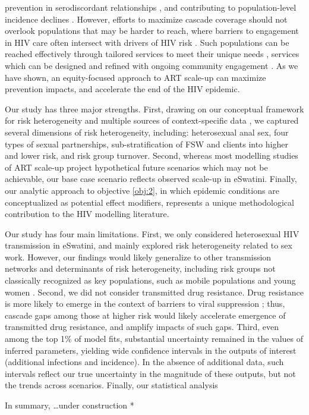 prevention in serodiscordant relationships \cite{Cohen2016},
and contributing to population-level incidence declines \cite{Havlir2020}.
However, efforts to maximize cascade coverage should not overlook
populations that may be harder to reach,
where barriers to engagement in HIV care often intersect with drivers of HIV risk
\cite{Wanyenze2016,Schwartz2017,Schmidt-Sane2022,Baral2019}.
Such populations can be reached effectively through
tailored services to meet their unique needs \cite{Ehrenkranz2019},
services which can be designed and refined with ongoing community engagement
\cite{Chikwari2018,Mlambo2019,Comins2022}.
As we have shown, an equity-focused approach to ART scale-up can maximize prevention impacts,
and accelerate the end of the HIV epidemic.
\par
Our study has three major strengths.
First, drawing on our conceptual framework for risk heterogeneity \cite[Table~1]{Knight2022-sr}
and multiple sources of context-specific data \cite{SDHS2006,SHIMS1,Justman2016,Baral2014,EswKP2014},
we captured several dimensions of risk heterogeneity, including:
heterosexual anal sex,
four types of sexual partnerships,
sub-stratification of FSW and clients into higher and lower risk,
and risk group turnover.
Second, whereas most modelling studies of ART scale-up
project hypothetical future scenarios which may not be achievable,
our base case scenario reflects observed scale-up in eSwatini.
Finally, our analytic approach to objective \ref{obj:2},
{\color{lightgray} in which epidemic conditions are conceptualized as potential effect modifiers,
represents a unique methodological contribution to the HIV modelling literature.}
\par
Our study has four main limitations.
First, we only considered heterosexual HIV transmission in eSwatini,
and mainly explored risk heterogeneity related to sex work.
However, our findings would likely generalize
to other transmission networks and determinants of risk heterogeneity,
including risk groups not classically recognized as key populations,
such as mobile populations and young women \cite{Tanser2015,Cheuk2020}.
Second, we did not consider transmitted drug resistance.
Drug resistance is more likely to emerge
in the context of barriers to viral suppression \cite{Pham2014};
thus, cascade gaps among those at higher risk
would likely accelerate emergence of transmitted drug resistance, and amplify impacts of such gaps.
Third, even among the top 1\% of model fits,
substantial uncertainty remained in the values of inferred parameters,
yielding wide confidence intervals in the outputs of interest (additional infections and incidence).
In the absence of additional data,
such intervals reflect our true uncertainty in the magnitude of these outputs,
but not the trends across scenarios.
{\color{lightgray}Finally, our statistical analysis}
\par
In summary, \dots * under construction *

